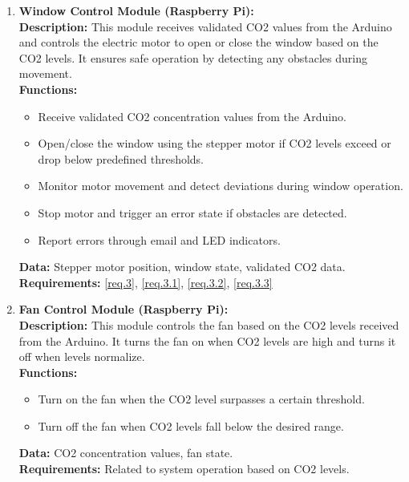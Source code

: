 \begin{enumerate}
    \item \textbf{Window Control Module (Raspberry Pi):} \\ 
        \textbf{Description:} This module receives validated CO2 values from the Arduino and controls the electric motor to open or close the window based on the CO2 levels. It ensures safe operation by detecting any obstacles during movement. \\ 
        \textbf{Functions:}
        \begin{itemize}
            \item Receive validated CO2 concentration values from the Arduino.
            \item Open/close the window using the stepper motor if CO2 levels exceed or drop below predefined thresholds.
            \item Monitor motor movement and detect deviations during window operation.
            \item Stop motor and trigger an error state if obstacles are detected.
            \item Report errors through email and LED indicators.
        \end{itemize}
        \textbf{Data:} Stepper motor position, window state, validated CO2 data. \\ 
        \textbf{Requirements:} \ref{req.3},  \ref{req.3.1}, \ref{req.3.2}, \ref{req.3.3} \\
        \newpage
    \item \textbf{Fan Control Module (Raspberry Pi):} \\ 
        \textbf{Description:} This module controls the fan based on the CO2 levels received from the Arduino. It turns the fan on when CO2 levels are high and turns it off when levels normalize. \\ 
        \textbf{Functions:}
        \begin{itemize}
            \item Turn on the fan when the CO2 level surpasses a certain threshold.
            \item Turn off the fan when CO2 levels fall below the desired range.
        \end{itemize}
        \textbf{Data:} CO2 concentration values, fan state. \\ 
        \textbf{Requirements:} Related to system operation based on CO2 levels.
\end{enumerate}


